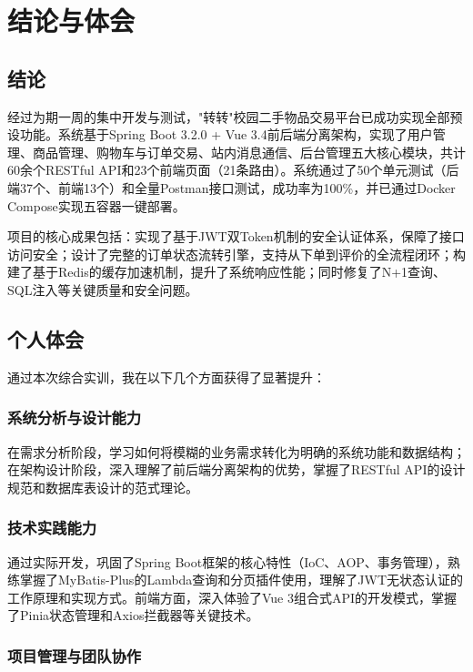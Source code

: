 \documentclass[12pt,a4paper,oneside]{ctexart}
\begin{document}
\section{结论与体会}

\subsection{结论}

经过为期一周的集中开发与测试，"转转"校园二手物品交易平台已成功实现全部预设功能。系统基于Spring Boot 3.2.0 + Vue 3.4前后端分离架构，实现了用户管理、商品管理、购物车与订单交易、站内消息通信、后台管理五大核心模块，共计60余个RESTful API和23个前端页面（21条路由）。系统通过了50个单元测试（后端37个、前端13个）和全量Postman接口测试，成功率为100\%，并已通过Docker Compose实现五容器一键部署。

项目的核心成果包括：实现了基于JWT双Token机制的安全认证体系，保障了接口访问安全；设计了完整的订单状态流转引擎，支持从下单到评价的全流程闭环；构建了基于Redis的缓存加速机制，提升了系统响应性能；同时修复了N+1查询、SQL注入等关键质量和安全问题。

\subsection{个人体会}

通过本次综合实训，我在以下几个方面获得了显著提升：

\subsubsection{系统分析与设计能力}

在需求分析阶段，学习如何将模糊的业务需求转化为明确的系统功能和数据结构；在架构设计阶段，深入理解了前后端分离架构的优势，掌握了RESTful API的设计规范和数据库表设计的范式理论。

\subsubsection{技术实践能力}

通过实际开发，巩固了Spring Boot框架的核心特性（IoC、AOP、事务管理），熟练掌握了MyBatis-Plus的Lambda查询和分页插件使用，理解了JWT无状态认证的工作原理和实现方式。前端方面，深入体验了Vue 3组合式API的开发模式，掌握了Pinia状态管理和Axios拦截器等关键技术。

\subsubsection{项目管理与团队协作}
\end{document}
